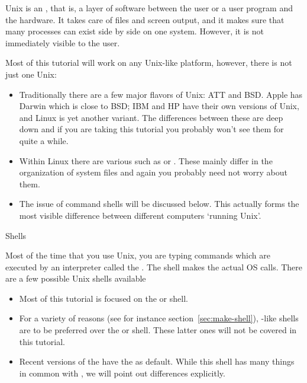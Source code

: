 
\lstset{language=bash}

Unix is an , that is, a layer of software
between the user or a user program and the hardware. It takes care of
files and screen output, and it makes sure that many processes can exist
side by side on one system. However, it is not immediately visible to
the user.

Most of this tutorial will work on any Unix-like platform,
however, there is not just one Unix:
\begin{itemize}
\item Traditionally there are a few major flavors of Unix: ATT and BSD.
  Apple has Darwin which is close to BSD; IBM and HP have their own
  versions of Unix, and Linux is yet another variant. The differences between
  these are deep down and if you are taking this tutorial you probably
  won't see them for quite a while.
\item Within Linux there are various 
  such as  or . These mainly differ
  in the organization of system files and again you probably need not worry
  about them.
\item The issue of command shells will be discussed below.
  This actually forms the most visible difference between different
  computers `running Unix'.
\end{itemize}


 {Shells}

Most of the time that you use Unix, you are typing commands which are
executed by an interpreter called the . The shell
makes the actual \ac{OS} calls. There are a few possible Unix shells
available
\begin{itemize}
\item Most of this tutorial is focused on the
   or  shell.
\item For a variety of reasons (see for instance section~\ref{sec:make-shell}),
  -like shells are to be preferred over the
   or  shell. These latter ones will not be covered
  in this tutorial.
\item Recent versions of the 
  have the  as default.
  While this shell has many things in common with ,
  we will point out differences explicitly.
\end{itemize}

